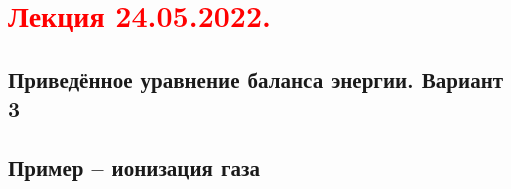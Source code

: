 \documentclass[main.tex]{subfiles}
\begin{document}
\section{\textcolor{red}{Лекция 24.05.2022.}}

\subsection{Приведённое уравнение баланса энергии. Вариант 3}

\subsection{Пример -- ионизация газа}
\end{document}
